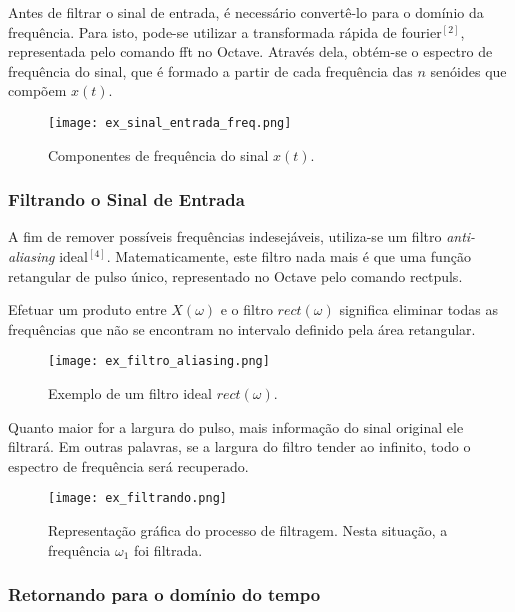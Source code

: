 \documentclass[journal]{IEEEtran}
\begin{document}
Antes de filtrar o sinal de entrada, é necessário convertê-lo para o domínio da frequência. Para isto, pode-se utilizar a transformada rápida de fourier$^{[2]}$, representada pelo comando {\selectfont fft} no Octave. Através dela, obtém-se o espectro de frequência do sinal, que é formado a partir de cada frequência das $n$ senóides que compõem $x(t)$.

\begin{figure}[H]
\captionsetup{justification=centering}
\centering %
\texttt{[image: ex\_sinal\_entrada\_freq.png]} %
\caption{Componentes de frequência do sinal $x(t)$.}
\end{figure}

\subsubsection{Filtrando o Sinal de Entrada}

A fim de remover possíveis frequências indesejáveis, utiliza-se um filtro \textit{anti-aliasing} ideal$^{[4]}$. Matematicamente, este filtro nada mais é que uma função retangular de pulso único, representado no Octave pelo comando {\selectfont rectpuls}. 

Efetuar um produto entre $X(\omega)$ e o filtro $rect(\omega)$ significa eliminar todas as frequências que não se encontram no intervalo definido pela área retangular. 

\begin{figure}[H]
\captionsetup{justification=centering}
\centering %
\texttt{[image: ex\_filtro\_aliasing.png]} %
\caption{Exemplo de um filtro ideal $rect(\omega)$.}
\end{figure}

Quanto maior for a largura do pulso, mais informação do sinal original ele filtrará. Em outras palavras, se a largura do filtro tender ao infinito, todo o espectro de frequência será recuperado.

\begin{figure}[H]
\captionsetup{justification=centering}
\centering %
\texttt{[image: ex\_filtrando.png]} %
\caption{Representação gráfica do processo de filtragem. Nesta situação, a frequência $\omega$$_1$ foi filtrada.}
\end{figure}

\subsubsection{Retornando para o domínio do tempo}
\end{document}
